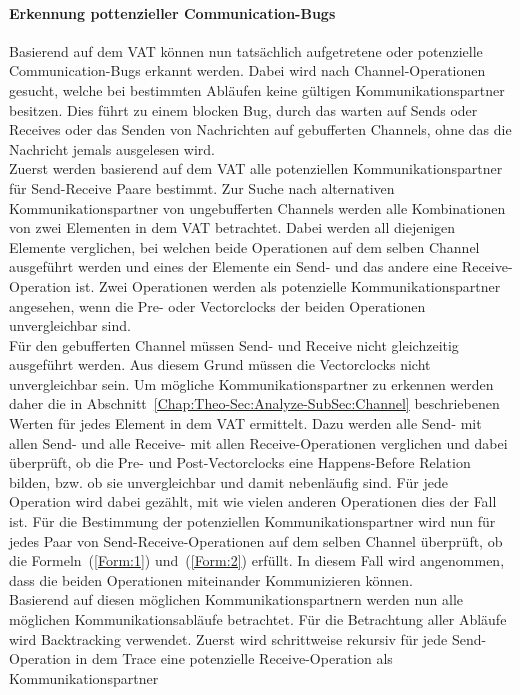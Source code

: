 \paragraph{Erkennung pottenzieller Communication-Bugs}
Basierend auf dem VAT können nun tatsächlich aufgetretene oder potenzielle 
Communication-Bugs erkannt werden. Dabei wird nach Channel-Operationen 
gesucht, welche bei bestimmten Abläufen keine gültigen Kommunikationspartner
besitzen. Dies führt zu einem blocken Bug, durch das warten auf 
Sends oder Receives oder das Senden von Nachrichten auf gebufferten 
Channels, ohne das die Nachricht jemals ausgelesen wird.\\  
Zuerst werden basierend auf dem VAT alle potenziellen Kommunikationspartner 
für Send-Receive Paare bestimmt.
Zur Suche nach alternativen Kommunikationspartner von ungebufferten Channels
werden alle Kombinationen
von zwei Elementen in dem VAT betrachtet. Dabei werden all diejenigen 
Elemente verglichen, bei welchen beide Operationen auf dem selben Channel 
ausgeführt werden und eines der 
Elemente ein Send- und das andere eine Receive-Operation ist. Zwei Operationen
werden als potenzielle Kommunikationspartner angesehen, wenn die Pre- oder
Vectorclocks der beiden 
Operationen unvergleichbar sind.\\
Für den gebufferten Channel müssen Send- und Receive nicht 
gleichzeitig ausgeführt werden. Aus diesem Grund müssen die Vectorclocks 
nicht unvergleichbar sein. Um mögliche Kommunikationspartner zu erkennen 
werden daher 
die in Abschnitt~\ref{Chap:Theo-Sec:Analyze-SubSec:Channel} beschriebenen 
Werten für jedes Element in dem VAT ermittelt. Dazu werden alle Send- mit allen 
Send- und alle Receive- mit allen Receive-Operationen verglichen 
und dabei überprüft, ob die Pre- und Post-Vectorclocks eine Happens-Before 
Relation bilden, bzw. ob sie unvergleichbar und damit nebenläufig sind. 
Für jede Operation wird dabei gezählt, mit wie vielen anderen Operationen 
dies der Fall ist.
Für die Bestimmung der potenziellen Kommunikationspartner wird nun 
für jedes Paar von Send-Receive-Operationen auf dem selben Channel 
überprüft, 
ob die Formeln~(\eqref{Form:1}) und~(\eqref{Form:2}) 
erfüllt. In diesem Fall wird angenommen, dass die beiden Operationen
miteinander Kommunizieren können.\\
Basierend auf diesen möglichen Kommunikationspartnern werden nun alle möglichen
Kommunikationsabläufe betrachtet. Für die Betrachtung aller Abläufe 
wird Backtracking verwendet. Zuerst wird schrittweise rekursiv für jede Send-Operation 
in dem Trace eine potenzielle Receive-Operation als Kommunikationspartner 
